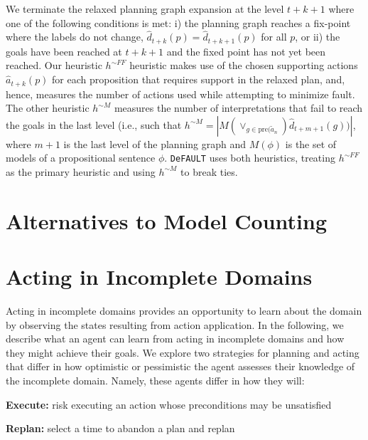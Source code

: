 \documentclass{article}
\def\und#1{\noindent{\bf #1}:}
\newenvironment{packed_itemize}{
\begin{itemize}
  \setlength{\itemsep}{1pt}
  \setlength{\parskip}{0pt}
  \setlength{\parsep}{0pt}
}{\end{itemize}}
\def\FFRISKY{{\tt DeFAULT}}
\def\und#1{\medskip{\noindent\bf #1:}}
\begin{document}
\und{Heuristic Computation}   We terminate the relaxed planning graph expansion at the level $t+k+1$ where one of the following conditions is met: i) the planning graph reaches a fix-point where the
labels do not change, $\hat{d}_{t+k}(p) = \hat{d}_{t+k+1}(p)$ for all $p$, or ii) the goals have been reached at $t+k+1$ and the fixed point has not yet been reached. Our heuristic $h^{\sim FF}$ heuristic makes use of the chosen supporting actions $\hat{a}_{t+k}(p)$ for each proposition that requires support in the relaxed plan, and, hence, measures the number of actions used while attempting to minimize fault.  The other heuristic
$h^{\sim M}$ measures the number of interpretations that fail to reach the goals in the last level (i.e., such that  $h^{\sim M} = |M(\vee_{g \in \text{pre}(\tilde{a}_n})\hat{d}_{t+m+1}(g))|$, where $m+1$ is the last level of the planning graph and $M(\phi)$ is the set of models of a propositional sentence $\phi$.  \FFRISKY{} uses both heuristics, treating  $h^{\sim FF}$ as the primary heuristic and using $h^{\sim M}$ to break ties.

\section{Alternatives to Model Counting}

\section{Acting in Incomplete Domains} Acting in incomplete domains provides an opportunity to learn about the domain by observing the states resulting from action application.  In the following, we describe what an agent can learn from acting in incomplete domains and how they might achieve their goals.  We explore two strategies for planning and acting that differ in how optimistic or pessimistic the agent assesses their knowledge of the incomplete domain.  Namely, these agents differ in how they will: 
\begin{packed_itemize}
\item {\bf Execute:} risk executing an action whose preconditions may be unsatisfied
\item {\bf Replan:} select a time to abandon a plan and replan
\end{packed_itemize}
\end{document}
